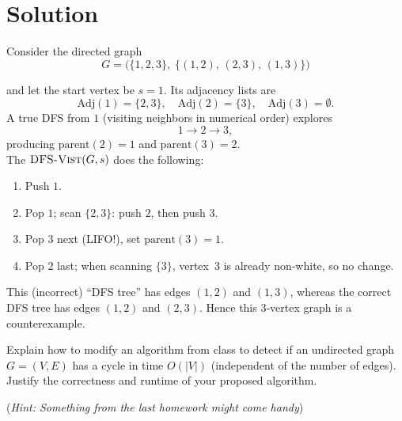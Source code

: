 \documentclass[11pt]{article}
\begin{document}
    \section*{Solution}
    
    Consider the directed graph
    \[
      G = \bigl(\{1,2,3\},\;\{(1,2),\,(2,3),\,(1,3)\}\bigr)
    \]
    \begin{figure}[h]
        \centering
        \end{figure}
    and let the start vertex be \(s=1\).  Its adjacency lists are
    \[
      \mathrm{Adj}(1)=\{2,3\},\quad
      \mathrm{Adj}(2)=\{3\},\quad
      \mathrm{Adj}(3)=\emptyset.
    \]
    A true DFS from \(1\) (visiting neighbors in numerical order) explores
    \[
      1 \to 2 \to 3,
    \]
    producing \(\mathrm{parent}(2)=1\) and \(\mathrm{parent}(3)=2\).\\
    
    The $\textsc{DFS-Vist}(G,s)$ does the following:
    
    \begin{enumerate}
      \item Push \(1\).
      \item Pop \(1\); scan \(\{2,3\}\): push \(2\), then push \(3\).
      \item Pop \(3\) next (LIFO!), set \(\mathrm{parent}(3)=1\).
      \item Pop \(2\) last; when scanning \(\{3\}\), vertex 3 is already non‑white, so no change.
    \end{enumerate}
    
    This (incorrect) “DFS tree” has edges \((1,2)\) and \((1,3)\), whereas the correct DFS tree has edges \((1,2)\) and \((2,3)\).  Hence this 3‑vertex graph is a counterexample. 
   
    \newpage
    \begin{tcolorbox}[title={Problem 3 (Cycle Detection, 20 pts)}] \setlength\parindent{1em}
         Explain how to modify an algorithm from class to detect if an undirected graph $G=(V,E)$ has a cycle in time $O(|V|)$ (independent of the number of edges). Justify the correctness and runtime of your proposed algorithm. 
         
         (\textit{Hint: Something from the last homework might come handy})
    \end{tcolorbox}
    
\end{document}

